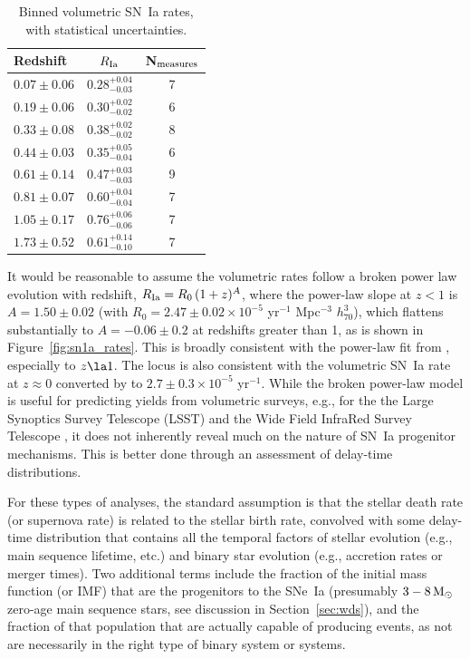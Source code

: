 \documentclass[apj]{aastex62}
\begin{document}
\begin{table}[h]
   \centering
   \caption{Binned volumetric SN~Ia rates, with statistical uncertainties.}
   \begin{tabular}{lcc} 
   \hline
   \hline
   Redshift & $R_{\rm Ia}$\tablenotemark{a}&N$_{\rm measures}$\\
   \hline
$0.07 \pm{0.06}$ & $0.28^{+0.04}_{-0.03}$& 7\\
$0.19 \pm{0.06}$ & $0.30^{+0.02}_{-0.02}$& 6\\
$0.33 \pm{0.08}$ & $0.38^{+0.02}_{-0.02}$& 8\\
$0.44 \pm{0.03}$ & $0.35^{+0.05}_{-0.04}$& 6\\
$0.61 \pm{0.14}$ & $0.47^{+0.03}_{-0.03}$& 9\\
$0.81 \pm{0.07}$ & $0.60^{+0.04}_{-0.04}$& 7\\
$1.05 \pm{0.17}$ & $0.76^{+0.06}_{-0.06}$& 7\\
$1.73 \pm{0.52}$ & $0.61^{+0.14}_{-0.10}$& 7\\
\hline
   \end{tabular}
   \label{tab:sn1a_bin}
\end{table}

It would be reasonable to assume the volumetric rates follow a broken power law evolution with redshift, $R_{\rm Ia}=R_0\,(1+z)^A$, where  the power-law slope at $z<1$ is $A=1.50\pm0.02$ (with $R_0 = 2.47\pm0.02\times10^{-5}$ yr$^{-1}$ Mpc$^{-3}$ $h_{70}^3$), which flattens substantially to $A=-0.06\pm0.2$ at redshifts greater than 1, as is shown in  Figure~\ref{fig:sn1a_rates}. This is broadly consistent with the power-law fit from \cite{Okumura:2014}, especially to $z\la1$. The locus is also consistent with the volumetric SN~Ia rate at $z\approx0$ converted by \cite{Li:2011b} to $2.7\pm0.3\times10^{-5}$ yr$^{-1}$. While the broken power-law model is useful for predicting yields from volumetric surveys, e.g., for the the Large Synoptics Survey Telescope (LSST) and the Wide Field InfraRed Survey Telescope \cite[\textit{WFIRST, }][]{Hounsell:2018fv}, it does not inherently reveal much on the nature of SN~Ia progenitor mechanisms. This is better done through an assessment of delay-time distributions.

For these types of analyses, the standard assumption is that the stellar death rate (or supernova rate) is related to the stellar birth rate, convolved with some delay-time distribution that contains all the temporal factors of stellar evolution (e.g., main sequence lifetime, etc.) and binary star evolution (e.g., accretion rates or merger times). Two additional terms include the fraction of the initial mass function (or IMF) that are the progenitors to the SNe~Ia (presumably $3 - 8\, \rm{M}_{\odot}$ zero-age main sequence stars, see discussion in Section~\ref{sec:wds}), and the fraction of that population that are actually capable of producing events, as not are necessarily in the right type of binary system or systems.
\end{document}
